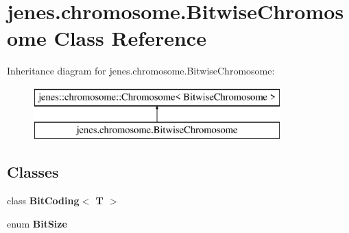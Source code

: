 \hypertarget{classjenes_1_1chromosome_1_1_bitwise_chromosome}{\section{jenes.\-chromosome.\-Bitwise\-Chromosome Class Reference}
\label{classjenes_1_1chromosome_1_1_bitwise_chromosome}
}
Inheritance diagram for jenes.\-chromosome.\-Bitwise\-Chromosome\-:\begin{figure}[H]
\begin{center}
\leavevmode
\includegraphics[height=2.000000cm]{classjenes_1_1chromosome_1_1_bitwise_chromosome}
\end{center}
\end{figure}
\subsection*{Classes}
\begin{DoxyCompactItemize}
\item 
class {\bfseries Bit\-Coding$<$ T $>$}
\item 
enum {\bfseries Bit\-Size}
\end{DoxyCompactItemize}

